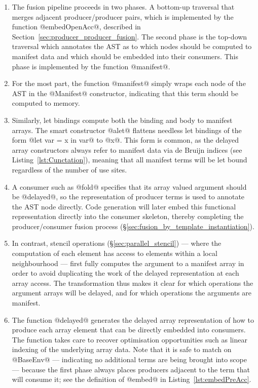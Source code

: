 \begin{enumerate}
\item The fusion pipeline proceeds in two phases. A bottom-up traversal that
    merges adjacent producer/producer pairs, which is implemented by the
    function @embedOpenAcc@, described in
    Section~\ref{sec:producer_producer_fusion}. The second phase is the top-down
    traversal which annotates the AST as to which nodes should be computed to
    manifest data and which should be embedded into their consumers. This phase
    is implemented by the function @manifest@.

\item For the most part, the function @manifest@ simply wraps each node of the
    AST in the @Manifest@ constructor, indicating that this term should be
    computed to memory.

\item Similarly, let bindings compute both the binding and body to manifest
    arrays. The smart constructor @alet@ flattens needless let bindings of the
    form @let var = x in var@ to @x@. This form is common, as the delayed array
    constructors always refer to manifest data via de Bruijn indices (see
    Listing~\ref{lst:Cunctation}), meaning that all manifest terms will be let
    bound regardless of the number of use sites.

\item A consumer such as @fold@ specifies that its array valued argument should
    be @delayed@, so the representation of producer terms is used to annotate
    the AST node directly. Code generation will later embed this functional
    representation directly into the consumer skeleton, thereby completing the
    producer/consumer fusion process
    (\S\ref{sec:fusion_by_template_instantiation}).

\item In contrast, stencil operations (\S\ref{sec:parallel_stencil}) --- where
    the computation of each element has access to elements within a local
    neighbourhood --- first fully computes the argument to a manifest array in
    order to avoid duplicating the work of the delayed representation at each
    array access. The transformation thus makes it clear for which operations
    the argument arrays will be delayed, and for which operations the arguments
    are manifest.

\item The function @delayed@ generates the delayed array representation of how
    to produce each array element that can be directly embedded into consumers.
    The function takes care to recover optimisation opportunities such as linear
    indexing of the underlying array data. Note that it is safe to match on
    @BaseEnv@ --- indicating no additional terms are being brought into scope
    --- because the first phase always places producers adjacent to the term
    that will consume it; see the definition of @embed@ in
    Listing~\ref{lst:embedPreAcc}.

\end{enumerate}

